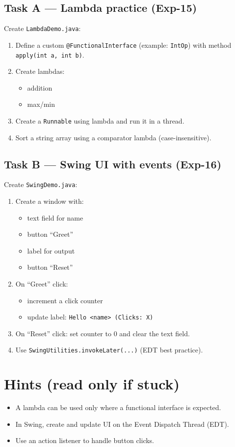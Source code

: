 \documentclass[11pt]{article}
\begin{document}
\subsection{Task A --- Lambda practice (Exp-15)}
Create \texttt{LambdaDemo.java}:
\begin{enumerate}[leftmargin=*]
  \item Define a custom \texttt{@FunctionalInterface} (example: \texttt{IntOp}) with method \texttt{apply(int a, int b)}.
  \item Create lambdas:
  \begin{itemize}[leftmargin=*]
    \item addition
    \item max/min
  \end{itemize}
  \item Create a \texttt{Runnable} using lambda and run it in a thread.
  \item Sort a string array using a comparator lambda (case-insensitive).
\end{enumerate}

\subsection{Task B --- Swing UI with events (Exp-16)}
Create \texttt{SwingDemo.java}:
\begin{enumerate}[leftmargin=*]
  \item Create a window with:
  \begin{itemize}[leftmargin=*]
    \item text field for name
    \item button ``Greet''
    \item label for output
    \item button ``Reset''
  \end{itemize}
  \item On ``Greet'' click:
  \begin{itemize}[leftmargin=*]
    \item increment a click counter
    \item update label: \texttt{Hello <name> (Clicks: X)}
  \end{itemize}
  \item On ``Reset'' click: set counter to 0 and clear the text field.
  \item Use \texttt{SwingUtilities.invokeLater(...)} (EDT best practice).
\end{enumerate}

\section{Hints (read only if stuck)}
\begin{itemize}[leftmargin=*]
  \item A lambda can be used only where a functional interface is expected.
  \item In Swing, create and update UI on the Event Dispatch Thread (EDT).
  \item Use an action listener to handle button clicks.
\end{itemize}
\end{document}
